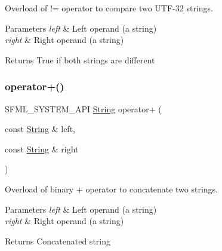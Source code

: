 Overload of != operator to compare two U\+T\+F-\/32 strings. 


\begin{DoxyParams}{Parameters}
{\em left} & Left operand (a string) \\
\hline
{\em right} & Right operand (a string)\\
\hline
\end{DoxyParams}
\begin{DoxyReturn}{Returns}
True if both strings are different \begin{DoxyVerb}\end{DoxyVerb}
 
\end{DoxyReturn}
\mbox{\label{classsf_1_1_string_a55ef2bf7dc6b295ef7127b0bc1e58760}} 
\subsubsection{\texorpdfstring{operator+()}{operator+()}}
{\footnotesize\ttfamily S\+F\+M\+L\+\_\+\+S\+Y\+S\+T\+E\+M\+\_\+\+A\+PI \mbox{\hyperlink{classsf_1_1_string}{String}} operator+ (\begin{DoxyParamCaption}\item[{const \mbox{\hyperlink{classsf_1_1_string}{String}} \&}]{left,  }\item[{const \mbox{\hyperlink{classsf_1_1_string}{String}} \&}]{right }\end{DoxyParamCaption})\hspace{0.3cm}{\ttfamily [related]}}



Overload of binary + operator to concatenate two strings. 


\begin{DoxyParams}{Parameters}
{\em left} & Left operand (a string) \\
\hline
{\em right} & Right operand (a string)\\
\hline
\end{DoxyParams}
\begin{DoxyReturn}{Returns}
Concatenated string \begin{DoxyVerb}\end{DoxyVerb}
 
\end{DoxyReturn}
\mbox{\label{classsf_1_1_string_ac2ca5a7703402a2bbafd85eec6d1e846}} 
